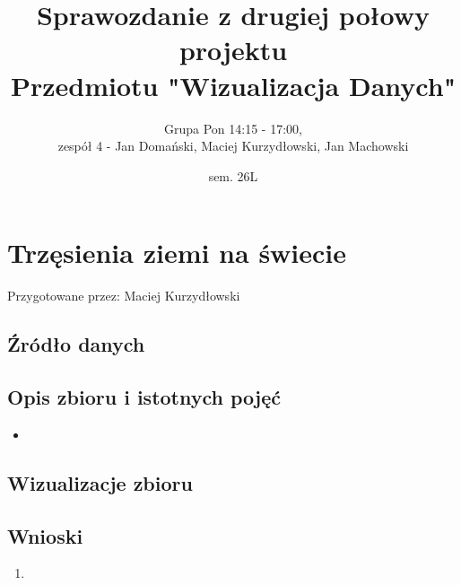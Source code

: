 \documentclass[12pt]{article}
\title{Sprawozdanie z drugiej połowy projektu\\
Przedmiotu "Wizualizacja Danych"}
\author{Grupa Pon 14:15 - 17:00, \\zespół 4 - Jan Domański, Maciej Kurzydłowski, Jan Machowski}
\date{sem. 26L}
\begin{document}
\maketitle
\tableofcontents
\newpage





\section{Trzęsienia ziemi na świecie}

Przygotowane przez: Maciej Kurzydłowski

\subsection{Źródło danych}

\subsection{Opis zbioru i istotnych pojęć}
\begin{itemize}
    \item 
\end{itemize}


\subsection{Wizualizacje zbioru}
\subsubsection{}
\begin{figure}[H]
    \caption{}
\end{figure}

\newpage
\subsection{Wnioski}
\begin{enumerate}
    \item 
\end{enumerate}
\end{document}
